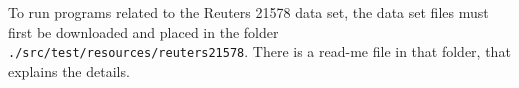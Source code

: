 \documentclass[10pt, a4paper, oneside]{article}
\begin{document}
To run programs related to the Reuters 21578 data set, the data set files must first be downloaded and placed in the folder
\texttt{./src/test/resources/reuters21578}. There is a read-me file in that folder, that explains the details.

\nocite{*} %
\end{document}

